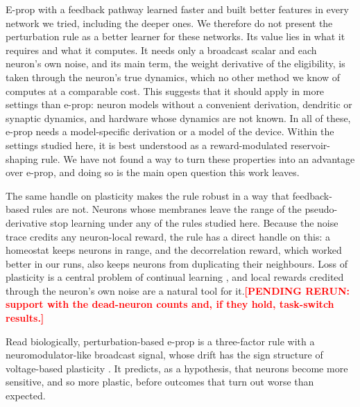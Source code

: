 \documentclass[10pt,twocolumn]{article}
\newcommand{\pending}[1]{\textcolor{red}{\bfseries[PENDING RERUN#1]}}
\newcommand{\method}{perturbation-based e-prop}   %
\begin{document}
E-prop with a feedback pathway learned faster and built better features in every network we
tried, including the deeper ones. We therefore do not present the perturbation rule as a
better learner for these networks. Its value lies in what it requires and what it computes. It
needs only a broadcast scalar and each neuron's own noise, and its main term, the weight
derivative of the eligibility, is taken through the neuron's true dynamics, which no other
method we know of computes at a comparable cost. This suggests that it should apply in more
settings than e-prop: neuron models without a convenient derivation, dendritic or synaptic
dynamics, and hardware whose dynamics are not known. In all of these, e-prop needs a
model-specific derivation or a model of the device. Within the settings studied here, it is
best understood as a reward-modulated reservoir-shaping rule. We have not found a way to turn
these properties into an advantage over e-prop, and doing so is the main open question this
work leaves.

The same handle on plasticity makes the rule robust in a way that feedback-based rules
are not. Neurons whose membranes leave the range of the pseudo-derivative stop learning
under any of the rules studied here. Because the noise trace credits any neuron-local
reward, the rule has a direct handle on this: a homeostat keeps neurons in range, and
the decorrelation reward, which worked better in our runs, also keeps neurons from
duplicating their neighbours. Loss of plasticity is a central problem of continual
learning \citep{kumar2023maintaining}, and local rewards credited through the
neuron's own noise are a natural tool for it.\pending{: support with the dead-neuron counts and, if they hold, task-switch results.}

Read biologically, \method{} is a three-factor rule with a neuromodulator-like broadcast
signal, whose drift has the sign structure of voltage-based plasticity
\citep{Clopath2010Voltage}. It predicts, as a hypothesis, that neurons become more
sensitive, and so more plastic, before outcomes that turn out worse than expected.
\end{document}
